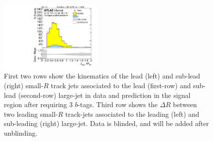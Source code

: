 \begin{figure}[htbp!]
\begin{center}
\includegraphics[width=0.45\textwidth,angle=-90]{figures/boosted/Signal/b77_ThreeTag_Signal_sublHCand_trk_dr_blind.pdf}
  \caption{First two rows show the kinematics of the lead (left) and sub-lead (right) small-$R$ track jets associated to the lead (first-row) and sub-lead (second-row) large-\R jet in data and prediction in the signal region after requiring 3 $b$-tags. Third row shows the $\Delta R$ between two leading small-$R$ track-jets associated to the leading (left) and sub-leading (right) large-\R jet. Data is blinded, and will be added after unblinding. }
  \label{fig:boosted-3b-signal-blind-ak2}
\end{center}
\end{figure}


